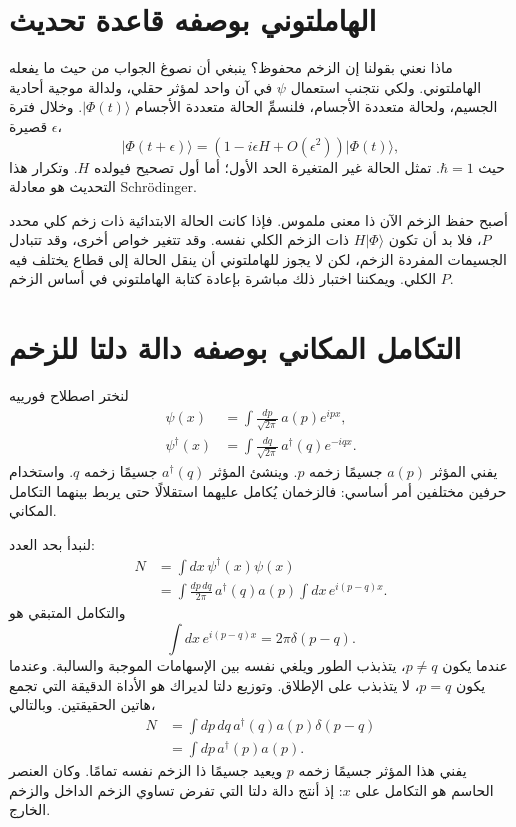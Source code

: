 \section{الهاملتوني بوصفه قاعدة تحديث}

ماذا نعني بقولنا إن الزخم محفوظ؟ ينبغي أن نصوغ الجواب من حيث ما يفعله الهاملتوني. ولكي نتجنب استعمال \(\psi\) في آن واحد لمؤثر حقلي، ولدالة موجية أحادية الجسيم، ولحالة متعددة الأجسام، فلنسمِّ الحالة متعددة الأجسام \(\lvert\Phi(t)\rangle\). وخلال فترة قصيرة \(\epsilon\)،
\begin{equation}
\lvert\Phi(t+\epsilon)\rangle
=\left(1-i\epsilon H+O(\epsilon^2)\right)
\lvert\Phi(t)\rangle,
\label{eq:l9-short-update}
\end{equation}
حيث \(\hbar=1\). تمثل الحالة غير المتغيرة الحد الأول؛ أما أول تصحيح فيولده \(H\). وتكرار هذا التحديث هو معادلة Schr\"odinger.

أصبح حفظ الزخم الآن ذا معنى ملموس. فإذا كانت الحالة الابتدائية ذات زخم كلي محدد \(P\)، فلا بد أن تكون \(H\lvert\Phi\rangle\) ذات الزخم الكلي نفسه. وقد تتغير خواص أخرى، وقد تتبادل الجسيمات المفردة الزخم، لكن لا يجوز للهاملتوني أن ينقل الحالة إلى قطاع يختلف فيه \(P\) الكلي. ويمكننا اختبار ذلك مباشرة بإعادة كتابة الهاملتوني في أساس الزخم.

\section{التكامل المكاني بوصفه دالة دلتا للزخم}

لنختر اصطلاح فورييه
\begin{align}
\psi(x)&=\int\frac{dp}{\sqrt{2\pi}}\,a(p)e^{ipx},\\
\psi^\dagger(x)&=\int\frac{dq}{\sqrt{2\pi}}\,a^\dagger(q)e^{-iqx}.
\label{eq:l9-field-fourier}
\end{align}
يفني المؤثر \(a(p)\) جسيمًا زخمه \(p\).
وينشئ المؤثر \(a^\dagger(q)\) جسيمًا زخمه \(q\). واستخدام حرفين مختلفين أمر أساسي: فالزخمان يُكامل عليهما استقلالًا حتى يربط بينهما التكامل المكاني.

لنبدأ بحد العدد:
\begin{align}
N
&=\int dx\,\psi^\dagger(x)\psi(x)\\
&=\int\frac{dp\,dq}{2\pi}\,
a^\dagger(q)a(p)
\int dx\,e^{i(p-q)x}.
\end{align}
والتكامل المتبقي هو
\begin{equation}
\int dx\,e^{i(p-q)x}=2\pi\delta(p-q).
\end{equation}
عندما يكون \(p\ne q\)، يتذبذب الطور ويلغي نفسه بين الإسهامات الموجبة والسالبة. وعندما يكون \(p=q\)، لا يتذبذب على الإطلاق. وتوزيع دلتا لديراك هو الأداة الدقيقة التي تجمع هاتين الحقيقتين. وبالتالي،
\begin{align}
N
&=\int dp\,dq\,a^\dagger(q)a(p)\delta(p-q)\\
&=\int dp\,a^\dagger(p)a(p).
\label{eq:l9-number-momentum}
\end{align}
يفني هذا المؤثر جسيمًا زخمه \(p\) ويعيد جسيمًا ذا الزخم نفسه تمامًا. وكان العنصر الحاسم هو التكامل على \(x\): إذ أنتج دالة دلتا التي تفرض تساوي الزخم الداخل والزخم الخارج.

